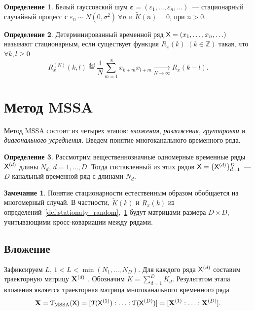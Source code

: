\documentclass[specialist,
substylefile = spbu.rtx,
               subf,href,colorlinks=true, 12pt]{disser}
\theoremstyle{definition}
\newtheorem{definition}{Определение}
\newtheorem{remark}{Замечание}
\begin{document}
\begin{definition}\label{def:stationaty_determ}
	Белый гауссовский шум $\boldsymbol{\varepsilon}=(\varepsilon_1,\ldots,\varepsilon_n,\ldots)$~--- стационарный случайный процесс с $\varepsilon_n\sim N(0, \sigma^2)~\forall n$ и $\widetilde K(n)=0$, при $n>0$.
\end{definition}
\begin{definition}
	Детерминированный временной ряд $\mathsf{X}=(x_1,\ldots,x_n,\ldots)$ называют стационарным, если существует функция $R_x(k)$ $(k\in\mathbb{Z})$ такая, что $\forall k,l\geqslant0$
	\begin{equation*}
		R_x^{(N)}(k,l)\overset{\text{def}}{=}\frac{1}{N}\sum_{m=1}^Nx_{k+m}x_{l+m}\underset{N\to\infty}\longrightarrow R_x(k - l).
	\end{equation*}
\end{definition}

\section{Метод MSSA}\label{sect:mssa}
Метод MSSA состоит из четырех этапов: \emph{вложения}, \emph{разложения}, \emph{группировки} и \emph{диагонального усреднения}. Введем понятие многоканального временного ряда.

\begin{definition}
	Рассмотрим вещественнозначные одномерные временные ряды $\mathsf{X}^{(d)}$ длины $N_d$, $d=1,\ldots,D$. Тогда составленный из этих рядов $\mathsf{X}=\{\mathsf{X}^{(d)}\}_{d=1}^D$~--- $D$-канальный временной ряд с длинами $N_d$.
\end{definition}
\begin{remark}
	Понятие стационарности естественным образом обобщается на многомерный случай. В частности, $\widetilde K(k)$ и $R_x(k)$ из определений~\ref{def:stationaty_random},~\ref{def:stationaty_determ} будут матрицами размера $D\times D$, учитывающими кросс-ковариации между рядами.
\end{remark}

\subsection{Вложение}\label{sect:embedding}
Зафиксируем $L$, $1<L<\min(N_1,\ldots,N_D)$. Для каждого ряда $\mathsf{X}^{(d)}$ составим траекторную матрицу $\mathbf{X}^{(d)}$ . Обозначим $K=\sum_{d=1}^D K_d$. Результатом этапа вложения является траекторная матрица многоканального временного ряда
\begin{equation}\label{eq:embedding_mssa}
	\mathbf{X}=\EuScript{T}_{\text{MSSA}}(\mathsf{X})=[\EuScript{T}(\mathsf{X}^{(1)}):\ldots:\EuScript{T}(\mathsf{X}^{(D)})]=[\mathbf{X}^{(1)}:\ldots:\mathbf{X}^{(D)}].
\end{equation}
\end{document}
